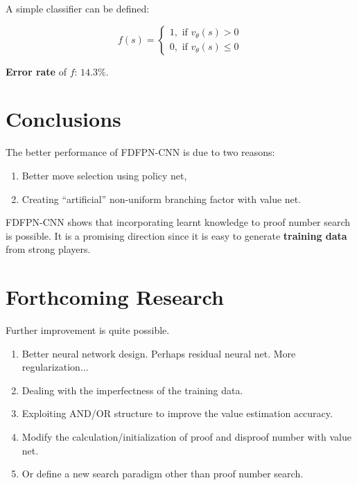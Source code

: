 \documentclass[a0,portrait]{a0poster}
\begin{document}
\begin{multicols}{3}
A simple classifier can be defined:

$$f(s) = \begin{cases}
1, \mbox{ if } v_\theta(s) > 0 \\
0, \mbox{ if } v_\theta(s) \leq 0  
\end{cases}
$$


\textbf{Error rate} of $f$: $14.3\%$. 


\color{SaddleBrown} %

\section*{Conclusions}
The better performance of FDFPN-CNN is due to two reasons:

\begin{enumerate}
\item Better move selection using policy net,
\item Creating ``artificial'' non-uniform branching factor with value net.
\end{enumerate}

FDFPN-CNN shows that incorporating learnt knowledge to proof number search is possible. 
It is a promising direction since it is easy to generate \textbf{training data} from strong players.
 
\color{Black} %


\section*{Forthcoming Research}

Further improvement is quite possible. 
\begin{enumerate}
	\item Better neural network design. Perhaps residual neural net. More regularization...
	\item Dealing with the imperfectness of the training data. 
	\item Exploiting AND/OR structure to improve the value estimation accuracy. 
	\item Modify the calculation/initialization of proof and disproof number with value net.
    \item Or define a new search paradigm other than proof number search.
\end{enumerate}


\end{multicols}
\end{document}
